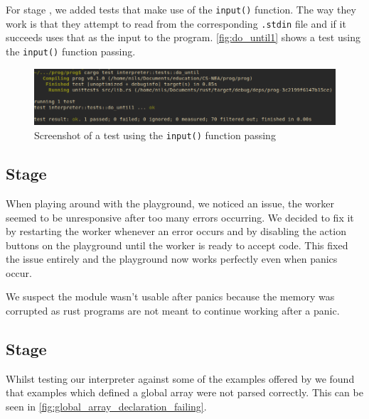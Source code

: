 \documentclass{article}
\newcommand{\subsecnum}{\the\value{subsection}}
\begin{document}
For stage \subsecnum, we added tests that make use of the \texttt{input()}
function. The way they work is that they attempt to read from the corresponding
\texttt{.stdin} file and if it succeeds uses that as the input to the program.
\autoref{fig:do_until1} shows a test using the \texttt{input()} function
passing.

\begin{figure}
	\includegraphics[width=\textwidth]{do_until1}
	\caption{Screenshot of a test using the \texttt{input()} function passing}
	\label{fig:do_until1}
\end{figure}

\subsection{Stage \subsecnum}

When playing around with the playground, we noticed an issue, the worker seemed
to be unresponsive after too many errors occurring. We decided to fix it by
restarting the worker whenever an error occurs and by disabling the action
buttons on the playground until the worker is ready to accept code. This fixed
the issue entirely and the playground now works perfectly even when panics
occur.

We suspect the module wasn't usable after panics because the memory was
corrupted as rust programs are not meant to continue working after a panic.

\subsection{Stage \subsecnum}

Whilst testing our interpreter against some of the examples offered by
 we found that examples which defined a global array
were not parsed correctly. This can be seen in
\autoref{fig:global_array_declaration_failing}.
\end{document}
